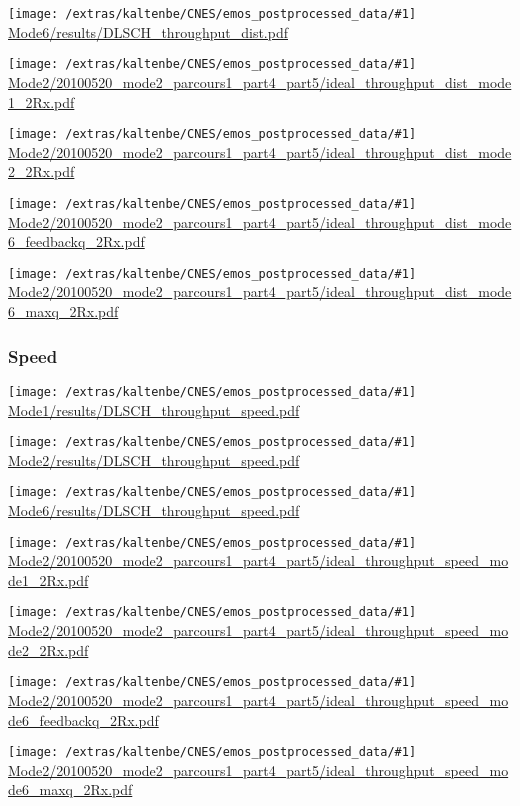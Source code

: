 \documentclass[a4paper,10pt]{article}
\newcommand{\printfile}[1]{
 \begin{minipage}{8cm}
  \centering
  \texttt{[image: /extras/kaltenbe/CNES/emos\_postprocessed\_data/\#1]}
  \url{#1}

 \end{minipage}
}
\begin{document}
\printfile{Mode6/results/DLSCH_throughput_dist.pdf}


\printfile{Mode2/20100520_mode2_parcours1_part4_part5/ideal_throughput_dist_mode1_2Rx.pdf}
%
\printfile{Mode2/20100520_mode2_parcours1_part4_part5/ideal_throughput_dist_mode2_2Rx.pdf}

\printfile{Mode2/20100520_mode2_parcours1_part4_part5/ideal_throughput_dist_mode6_feedbackq_2Rx.pdf}
%
\printfile{Mode2/20100520_mode2_parcours1_part4_part5/ideal_throughput_dist_mode6_maxq_2Rx.pdf}

\subsubsection{Speed}

\printfile{Mode1/results/DLSCH_throughput_speed.pdf}
\printfile{Mode2/results/DLSCH_throughput_speed.pdf}

\printfile{Mode6/results/DLSCH_throughput_speed.pdf}


\printfile{Mode2/20100520_mode2_parcours1_part4_part5/ideal_throughput_speed_mode1_2Rx.pdf}
%
\printfile{Mode2/20100520_mode2_parcours1_part4_part5/ideal_throughput_speed_mode2_2Rx.pdf}

\printfile{Mode2/20100520_mode2_parcours1_part4_part5/ideal_throughput_speed_mode6_feedbackq_2Rx.pdf}
%
\printfile{Mode2/20100520_mode2_parcours1_part4_part5/ideal_throughput_speed_mode6_maxq_2Rx.pdf}
\end{document}
